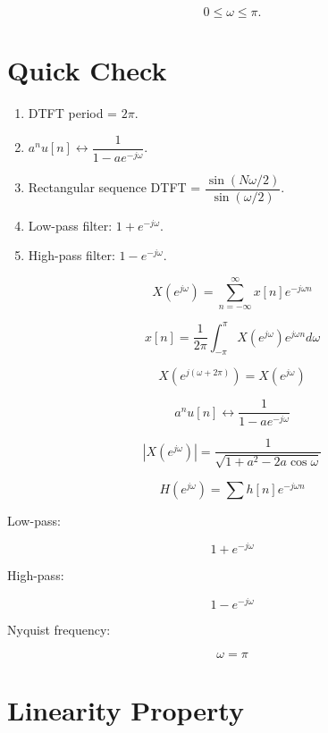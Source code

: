 \[
\boxed{
0\le\omega\le\pi.
}
\]


\section{Quick Check}

\begin{enumerate}
\item DTFT period = \(\boxed{2\pi}\).
\item \(a^n u[n]\leftrightarrow\boxed{\dfrac{1}{1-ae^{-j\omega}}}\).
\item Rectangular sequence DTFT = \(\boxed{\dfrac{\sin(N\omega/2)}{\sin(\omega/2)}}\).
\item Low-pass filter: \(\boxed{1+e^{-j\omega}}\).
\item High-pass filter: \(\boxed{1-e^{-j\omega}}\).
\end{enumerate}


\begin{tcolorbox}[title=One-Minute Revision,colback=blue!5]

\[
X(e^{j\omega})=
\sum_{n=-\infty}^{\infty}
x[n]e^{-j\omega n}
\]

\[
x[n]=
\frac{1}{2\pi}
\int_{-\pi}^{\pi}
X(e^{j\omega})e^{j\omega n}d\omega
\]

\[
X(e^{j(\omega+2\pi)})=X(e^{j\omega})
\]

\[
a^n u[n]
\leftrightarrow
\frac{1}{1-ae^{-j\omega}}
\]

\[
|X(e^{j\omega})|=
\frac{1}{\sqrt{1+a^2-2a\cos\omega}}
\]

\[
H(e^{j\omega})=
\sum h[n]e^{-j\omega n}
\]

Low-pass:

\[
1+e^{-j\omega}
\]

High-pass:

\[
1-e^{-j\omega}
\]

Nyquist frequency:

\[
\omega=\pi
\]

\end{tcolorbox}
\section{Linearity Property}

